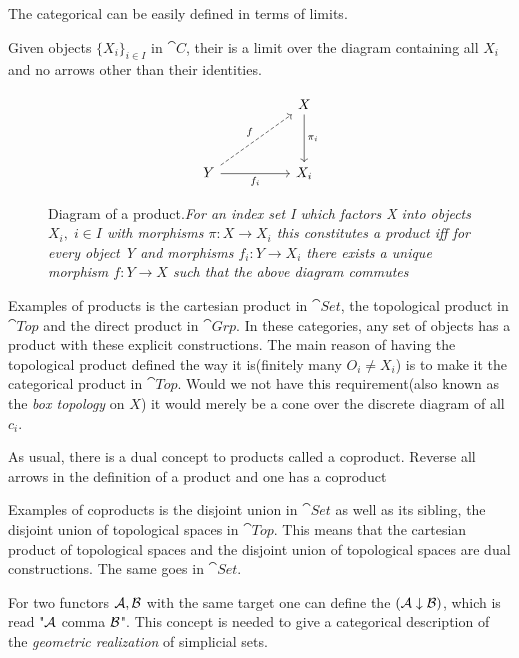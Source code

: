 \documentclass[../../main.tex]{subfiles}
\begin{document}
    The categorical  can be easily defined in terms of limits. 
    
    \begin{definition}
        Given objects $\{X_i\}_{i \in I}$ in $\cat{C}$, their  is a limit over the diagram containing all $X_i$ and no arrows other than their identities.
    \end{definition}

    \begin{figure}[H]
        \[
            \begin{tikzcd}[row sep = 8ex, column sep = 5em]
                & X \arrow[d, "\pi_i"] \\
                Y \arrow[ru,"f",dashed] \arrow[r,"f_i",swap] & X_i  
              \end{tikzcd}
        \]
        \caption{Diagram of a product.\textit{For an index set I which factors X into objects $X_i,\; i \in I$ with morphisms $\pi:X\to X_i$ this constitutes a product iff for every object Y and morphisms $f_i:Y\to X_i$ there exists a unique morphism $f:Y\to X$ such that the above diagram commutes}}
        \label{fig:product}
    \end{figure}
    
    Examples of products is the cartesian product in $\cat{Set}$, the topological product in $\cat{Top}$ and the direct product in $\cat{Grp}$. In these categories, any set of objects has a product with these explicit constructions. The main reason of having the topological product defined the way it is(finitely many $O_i \neq X_i$) is to make it the categorical product in $\cat{Top}$. Would we not have this requirement(also known as the \emph{box topology} on $X$) it would merely be a cone over the discrete diagram of all $c_i$.
    
    As usual, there is a dual concept to products called a coproduct. Reverse all arrows in the definition of a product and one has a coproduct

    Examples of coproducts is the disjoint union in $\cat{Set}$ as well as its sibling, the disjoint union of topological spaces in $\cat{Top}$. This means that the cartesian product of topological spaces and the disjoint union of topological spaces are dual constructions. The same goes in $\cat{Set}$.

    For two functors $\mathcal{A}, \mathcal{B}$ with the same target one can define the  $(\mathcal{A} \downarrow \mathcal{B})$, which is read "$\mathcal{A}$ comma $\mathcal{B}$". This concept is needed to give a categorical description of the \textit{geometric realization} of simplicial sets.
\end{document}
